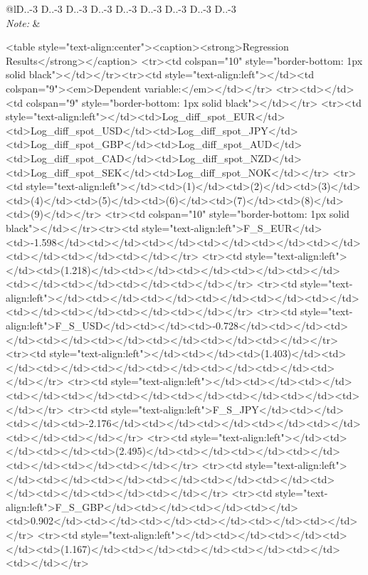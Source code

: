 \begin{table}[!htbp]
\begin{tabular}{@{\extracolsep{5pt}}lD{.}{.}{-3} D{.}{.}{-3} D{.}{.}{-3} D{.}{.}{-3} D{.}{.}{-3} D{.}{.}{-3} D{.}{.}{-3} D{.}{.}{-3} D{.}{.}{-3} }
\hline 
\hline \\[-1.8ex] 
\textit{Note:}  &  \\ 
\end{tabular} 
\end{table} 

<table style="text-align:center"><caption><strong>Regression Results</strong></caption>
<tr><td colspan="10" style="border-bottom: 1px solid black"></td></tr><tr><td style="text-align:left"></td><td colspan="9"><em>Dependent variable:</em></td></tr>
<tr><td></td><td colspan="9" style="border-bottom: 1px solid black"></td></tr>
<tr><td style="text-align:left"></td><td>Log_diff_spot_EUR</td><td>Log_diff_spot_USD</td><td>Log_diff_spot_JPY</td><td>Log_diff_spot_GBP</td><td>Log_diff_spot_AUD</td><td>Log_diff_spot_CAD</td><td>Log_diff_spot_NZD</td><td>Log_diff_spot_SEK</td><td>Log_diff_spot_NOK</td></tr>
<tr><td style="text-align:left"></td><td>(1)</td><td>(2)</td><td>(3)</td><td>(4)</td><td>(5)</td><td>(6)</td><td>(7)</td><td>(8)</td><td>(9)</td></tr>
<tr><td colspan="10" style="border-bottom: 1px solid black"></td></tr><tr><td style="text-align:left">F_S_EUR</td><td>-1.598</td><td></td><td></td><td></td><td></td><td></td><td></td><td></td><td></td></tr>
<tr><td style="text-align:left"></td><td>(1.218)</td><td></td><td></td><td></td><td></td><td></td><td></td><td></td><td></td></tr>
<tr><td style="text-align:left"></td><td></td><td></td><td></td><td></td><td></td><td></td><td></td><td></td><td></td></tr>
<tr><td style="text-align:left">F_S_USD</td><td></td><td>-0.728</td><td></td><td></td><td></td><td></td><td></td><td></td><td></td></tr>
<tr><td style="text-align:left"></td><td></td><td>(1.403)</td><td></td><td></td><td></td><td></td><td></td><td></td><td></td></tr>
<tr><td style="text-align:left"></td><td></td><td></td><td></td><td></td><td></td><td></td><td></td><td></td><td></td></tr>
<tr><td style="text-align:left">F_S_JPY</td><td></td><td></td><td>-2.176</td><td></td><td></td><td></td><td></td><td></td><td></td></tr>
<tr><td style="text-align:left"></td><td></td><td></td><td>(2.495)</td><td></td><td></td><td></td><td></td><td></td><td></td></tr>
<tr><td style="text-align:left"></td><td></td><td></td><td></td><td></td><td></td><td></td><td></td><td></td><td></td></tr>
<tr><td style="text-align:left">F_S_GBP</td><td></td><td></td><td></td><td>0.902</td><td></td><td></td><td></td><td></td><td></td></tr>
<tr><td style="text-align:left"></td><td></td><td></td><td></td><td>(1.167)</td><td></td><td></td><td></td><td></td><td></td></tr>
